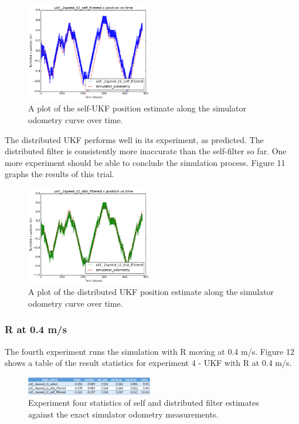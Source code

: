 \documentclass[conference]{IEEEtran} \usepackage[T1]{fontenc} \usepackage[backend=biber, style=ieee]{biblatex}
\begin{document}
\begin{figure}
\centering 
\includegraphics[width=0.49\textwidth]{ukf_2speed_t2_self_filtered_pos_err_graph}
\caption {A plot of the self-UKF position estimate along the simulator odometry curve over time.}
\label{pic10} 
\end{figure}

The distributed UKF performs well in its experiment, as predicted. The distributed filter is consistently 
more inaccurate than the self-filter so far. One more experiment should be able to conclude the simulation process. 
Figure 11 graphs the results of this trial. 

\begin{figure}
\centering 
\includegraphics[width=0.49\textwidth]{ukf_2speed_t2_dist_filtered_pos_err_graph}
\caption {A plot of the distributed UKF position estimate along the simulator odometry curve over time.}
\label{pic11} 
\end{figure}

\subsubsection{R at 0.4 m/s} \label{UKF .4}
The fourth experiment runs the simulation with R moving at 0.4 m/s. Figure 12 shows a table of the result statistics for experiment 4 - UKF 
with R at 0.4 m/s. 

\begin{figure}[!ht]
\label{pic12} 
\centering 
\includegraphics[width=0.49\textwidth]{ukf_4_table}
\caption{Experiment four statistics of self and distributed filter estimates against the exact simulator odometry measurements.} 
\end{figure}
\end{document}
